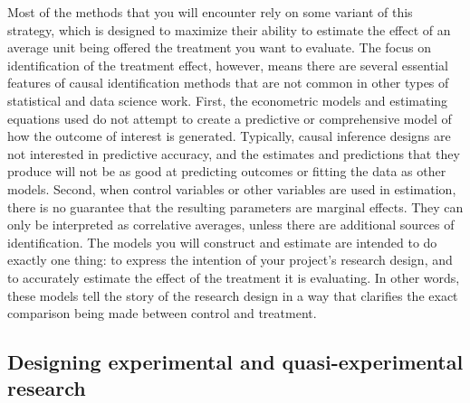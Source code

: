 \documentclass[
]{book}
\begin{document}
Most of the methods that you will encounter rely on some variant of this strategy,
which is designed to maximize their ability to estimate the effect
of an average unit being offered the treatment you want to evaluate.
The focus on identification of the treatment effect, however,
means there are several essential features of causal identification methods
that are not common in other types of statistical and data science work.
First, the econometric models and estimating equations used
do not attempt to create a predictive or comprehensive model
of how the outcome of interest is generated.
Typically, causal inference designs are not interested in predictive accuracy,
and the estimates and predictions that they produce
will not be as good at predicting outcomes or fitting the data as other models.
Second, when control variables or other variables are used in estimation,
there is no guarantee that the resulting parameters are marginal effects.
They can only be interpreted as correlative averages,
unless there are additional sources of identification.
The models you will construct and estimate are intended to do exactly one thing:
to express the intention of your project's research design,
and to accurately estimate the effect of the treatment it is evaluating.
In other words, these models tell the story of the research design
in a way that clarifies the exact comparison being made between control and treatment.

\hypertarget{designing-experimental-and-quasi-experimental-research}{%
\subsection*{Designing experimental and quasi-experimental research}\label{designing-experimental-and-quasi-experimental-research}}
\end{document}
